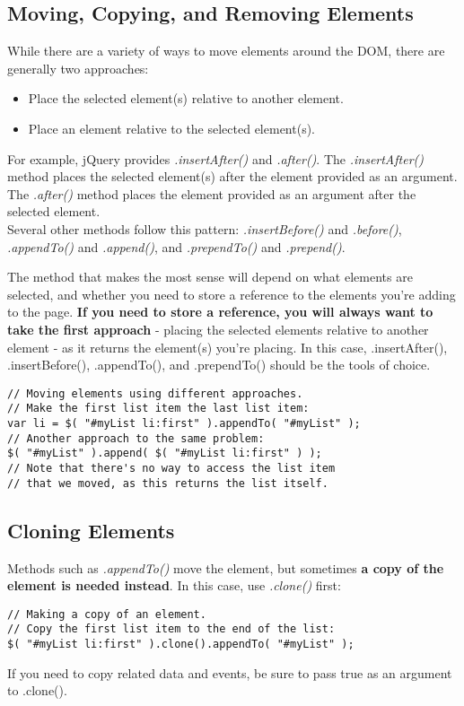 \documentclass[10pt,letterpaper]{report}
\begin{document}
\subsection{Moving, Copying, and Removing Elements}
While there are a variety of ways to move elements around the DOM, there are generally two approaches:
\begin{itemize}
\item Place the selected element(s) relative to another element.
\item Place an element relative to the selected element(s).
\end{itemize}
For example, jQuery provides \textit{.insertAfter()} and \textit{.after()}. The \textit{.insertAfter()} method places the selected element(s) after the element provided as an argument. The \textit{.after()} method places the element provided as an argument after the selected element.\\
Several other methods follow this pattern: \textit{.insertBefore()} and \textit{.before()}, \textit{.appendTo()} and \textit{.append()}, and \textit{.prependTo()} and \textit{.prepend()}.

The method that makes the most sense will depend on what elements are selected, and whether you need to store a reference to the elements you're adding to the page. \textbf{If you need to store a reference, you will always want to take the first approach} - placing the selected elements relative to another element - as it returns the element(s) you're placing. In this case, .insertAfter(), .insertBefore(), .appendTo(), and .prependTo() should be the tools of choice.
\begin{lstlisting}
// Moving elements using different approaches.
// Make the first list item the last list item:
var li = $( "#myList li:first" ).appendTo( "#myList" );
// Another approach to the same problem:
$( "#myList" ).append( $( "#myList li:first" ) );
// Note that there's no way to access the list item
// that we moved, as this returns the list itself.
\end{lstlisting}
\subsection{Cloning Elements}
Methods such as \textit{.appendTo()} move the element, but sometimes \textbf{a copy of the element is needed instead}. In this case, use \textit{.clone()} first:
\begin{lstlisting}
// Making a copy of an element.
// Copy the first list item to the end of the list:
$( "#myList li:first" ).clone().appendTo( "#myList" );
\end{lstlisting}
If you need to copy related data and events, be sure to pass true as an argument to .clone().
\end{document}
